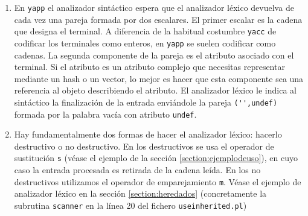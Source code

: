 \begin{enumerate}
\item
En \verb|yapp| el analizador sintáctico espera que el analizador
léxico devuelva de cada vez una pareja formada por dos escalares.
El primer escalar es la cadena que designa el terminal. A diferencia
de la habitual costumbre \verb|yacc| de codificar los terminales
como enteros, en \verb|yapp| se suelen codificar como cadenas.
La segunda componente de la pareja es el atributo asociado con el terminal.
Si el atributo es un atributo complejo que necesitas representar
mediante un hash o un vector, lo mejor es hacer que esta componente
sea una referencia al objeto describiendo el atributo.
El analizador léxico le indica al sintáctico la
finalización de la entrada enviándole la pareja 
\verb|('',undef)| formada por la palabra vacía con atributo \verb|undef|.

\item
Hay fundamentalmente dos formas de hacer el analizador
léxico: hacerlo destructivo o no destructivo.
En los destructivos se usa el operador de sustitución \verb|s|
(véase el ejemplo de la sección 
\ref{section:ejemplodeuso}), en cuyo caso la entrada procesada
es retirada de la cadena leída.
En los no destructivos utilizamos el operador
de emparejamiento \verb|m|. Véase 
el ejemplo de analizador léxico en
la sección \ref{section:heredados}
(concretamente la subrutina \verb|scanner| en la 
línea 20 del fichero \verb|useinherited.pl|)
\end{enumerate}

